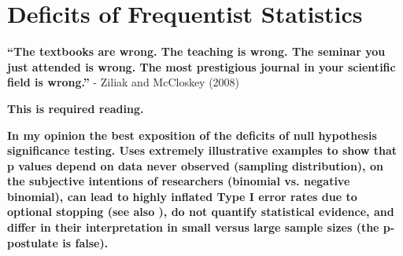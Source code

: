 \documentclass[12pt]{scrartcl}
\begin{document}
\section{Deficits of Frequentist Statistics}

\begin{displayquote}
\textbf{``The textbooks are wrong. The teaching is wrong. The seminar you just attended is wrong. The most prestigious journal in your scientific field is wrong.''} - Ziliak and McCloskey (2008)
\end{displayquote}

\begin{description}
  \item {}
  
  \item {}
  
  \item {}
   
  \item {}
  
  \item {}
  
  \item {}
  
  \item {}
  
  \item {}
  
  \item {}
  
  \item {}
  
  \item {}
  
  \textbf{This is required reading.}
  
  \item {}
    
  \item {}
  
  \textbf{In my opinion the best exposition of the deficits of null hypothesis significance testing. Uses extremely illustrative examples to show that p values depend on data never observed (sampling distribution), on the subjective intentions of researchers (binomial vs. negative binomial), can lead to highly inflated Type I error rates due to optional stopping (see also \cite{simmons2011false}), do not quantify statistical evidence, and differ in their interpretation in small versus large sample sizes (the p-postulate is false).}
  

\end{description}
\end{document}
